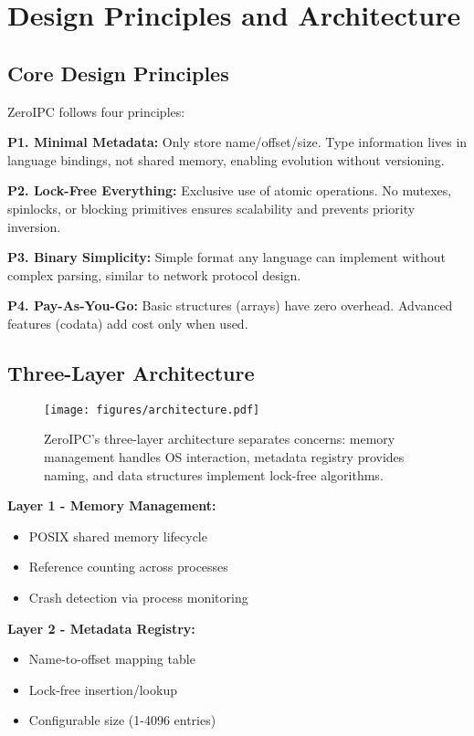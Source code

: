 \documentclass[sigconf,anonymous]{acmart}
\begin{document}
\section{Design Principles and Architecture}

\subsection{Core Design Principles}

ZeroIPC follows four principles:

\textbf{P1. Minimal Metadata:} Only store name/offset/size. Type information lives in language bindings, not shared memory, enabling evolution without versioning.

\textbf{P2. Lock-Free Everything:} Exclusive use of atomic operations. No mutexes, spinlocks, or blocking primitives ensures scalability and prevents priority inversion.

\textbf{P3. Binary Simplicity:} Simple format any language can implement without complex parsing, similar to network protocol design.

\textbf{P4. Pay-As-You-Go:} Basic structures (arrays) have zero overhead. Advanced features (codata) add cost only when used.

\subsection{Three-Layer Architecture}

\begin{figure}[h]
\centering
\texttt{[image: figures/architecture.pdf]}
\caption{ZeroIPC's three-layer architecture separates concerns: memory management handles OS interaction, metadata registry provides naming, and data structures implement lock-free algorithms.}
\label{fig:architecture}
\end{figure}

\textbf{Layer 1 - Memory Management:}
\begin{itemize}
\item POSIX shared memory lifecycle
\item Reference counting across processes
\item Crash detection via process monitoring
\end{itemize}

\textbf{Layer 2 - Metadata Registry:}
\begin{itemize}
\item Name-to-offset mapping table
\item Lock-free insertion/lookup
\item Configurable size (1-4096 entries)
\end{itemize}
\end{document}
